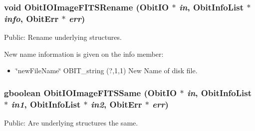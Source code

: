 \subsubsection{\setlength{\rightskip}{0pt plus 5cm}void Obit\-IOImage\-FITSRename ({\bf Obit\-IO} $\ast$ {\em in}, {\bf Obit\-Info\-List} $\ast$ {\em info}, {\bf Obit\-Err} $\ast$ {\em err})}\label{ObitIOImageFITS_8c_a22}


Public: Rename underlying structures. 

New name information is given on the info member: \begin{itemize}
\item \char`\"{}new\-File\-Name\char`\"{} OBIT\_\-string (?,1,1) New Name of disk file. 
\end{itemize}
\subsubsection{\setlength{\rightskip}{0pt plus 5cm}gboolean Obit\-IOImage\-FITSSame ({\bf Obit\-IO} $\ast$ {\em in}, {\bf Obit\-Info\-List} $\ast$ {\em in1}, {\bf Obit\-Info\-List} $\ast$ {\em in2}, {\bf Obit\-Err} $\ast$ {\em err})}\label{ObitIOImageFITS_8c_a21}


Public: Are underlying structures the same. 

